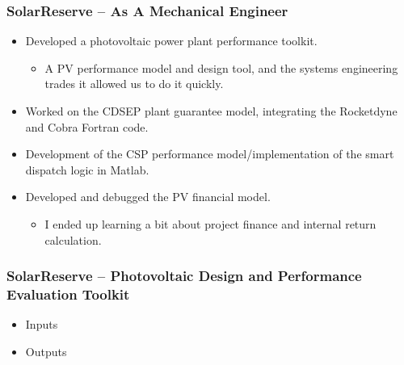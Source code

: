 \documentclass[aspectratio=169]{beamer}
\begin{document}
\begin{frame}
  \frametitle{SolarReserve -- As A Mechanical Engineer}
  \begin{itemize}
  \item Developed a photovoltaic power plant performance toolkit.
    \begin{itemize}
    \item A PV performance model and design tool, and the systems
      engineering trades it allowed us to do it quickly.
    \end{itemize}
  \item Worked on the CDSEP plant guarantee model, integrating the
    Rocketdyne and Cobra Fortran code.
  \item Development of the CSP performance model/implementation of the
    smart dispatch logic in Matlab.
  \item Developed and debugged the PV financial model.
    \begin{itemize}
    \item I ended up learning a bit about project finance and internal
      return calculation.
    \end{itemize}
  \end{itemize}
\end{frame}

\begin{frame}
  \frametitle{SolarReserve -- Photovoltaic Design and Performance Evaluation Toolkit}
  \begin{itemize}
  \item Inputs
  \item Outputs
  \end{itemize}
\end{frame}
\end{document}
